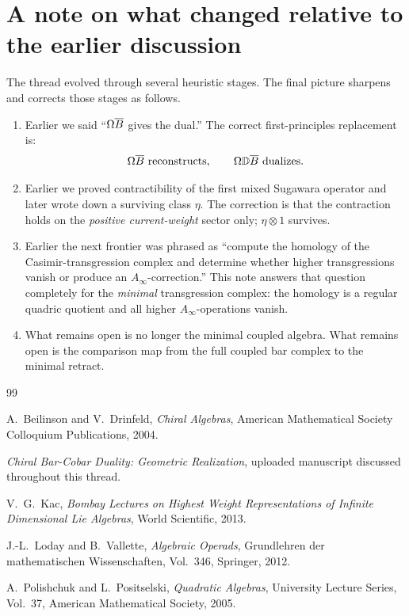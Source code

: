\section{A note on what changed relative to the earlier discussion}

The thread evolved through several heuristic stages. The final picture sharpens and corrects those stages as follows.

\begin{enumerate}[label=\textup{(\alph*)},leftmargin=2.2em]
\item Earlier we said ``\(\Omega\overline{B}\) gives the dual.'' The correct first-principles replacement is:
\[
\Omega\overline{B} \text{ reconstructs},\qquad \Omega\mathbb D\overline{B} \text{ dualizes}.
\]

\item Earlier we proved contractibility of the first mixed Sugawara operator and later wrote down a surviving class \(\eta\). The correction is that the contraction holds on the \emph{positive current-weight} sector only; \(\eta\otimes 1\) survives.

\item Earlier the next frontier was phrased as ``compute the homology of the Casimir-transgression complex and determine whether higher transgressions vanish or produce an \(A_\infty\)-correction.'' This note answers that question completely for the \emph{minimal} transgression complex: the homology is a regular quadric quotient and all higher \(A_\infty\)-operations vanish.

\item What remains open is no longer the minimal coupled algebra. What remains open is the comparison map from the full coupled bar complex to the minimal retract.
\end{enumerate}

\begin{thebibliography}{99}

A.~Beilinson and V.~Drinfeld,
\emph{Chiral Algebras},
American Mathematical Society Colloquium Publications, 2004.

\emph{Chiral Bar-Cobar Duality: Geometric Realization},
uploaded manuscript discussed throughout this thread.

V.~G.~Kac,
\emph{Bombay Lectures on Highest Weight Representations of Infinite Dimensional Lie Algebras},
World Scientific, 2013.

J.-L.~Loday and B.~Vallette,
\emph{Algebraic Operads},
Grundlehren der mathematischen Wissenschaften, Vol.~346, Springer, 2012.

A.~Polishchuk and L.~Positselski,
\emph{Quadratic Algebras},
University Lecture Series, Vol.~37, American Mathematical Society, 2005.

\end{thebibliography}

